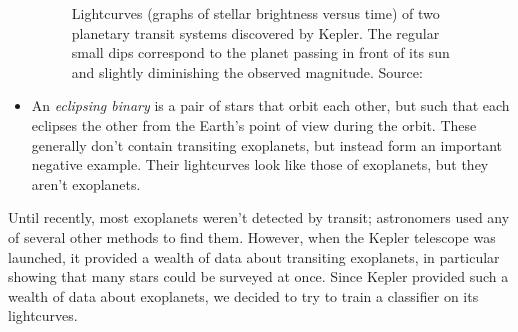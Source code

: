 \documentclass{amsart}
\begin{document}
\begin{itemize}
\begin{figure}
	\caption{Lightcurves (graphs of stellar brightness versus time) of two planetary transit systems discovered by Kepler. The regular small dips correspond to the planet passing in front of its sun and slightly diminishing the observed magnitude. Source: \cite{NASATR}}%
	\end{figure}
	\item An \emph{eclipsing binary} is a pair of stars that orbit each other, but such that each eclipses the other from the Earth's point of view during the orbit. These generally don't contain transiting exoplanets, but instead form an important negative example. Their lightcurves look like those of exoplanets, but they aren't exoplanets.
\end{itemize}

Until recently, most exoplanets weren't detected by transit; astronomers used any of several other methods to find them. However, when the Kepler telescope was launched, it provided a wealth of data about transiting exoplanets, in particular showing that many stars could be surveyed at once. Since Kepler provided such a wealth of data about exoplanets, we decided to try to train a classifier on its lightcurves.%
\end{document}
